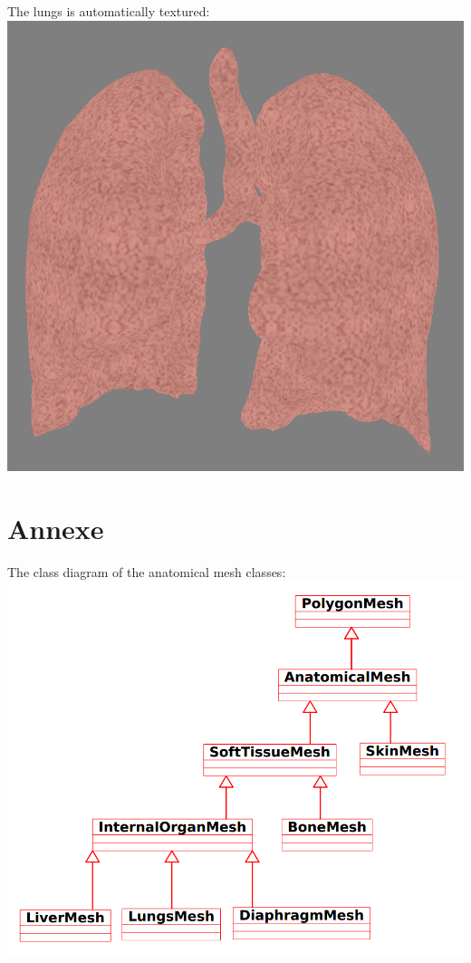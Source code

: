 \documentclass[12pt]{report}
\begin{document}
The lungs is automatically textured:\\

\includegraphics[scale = 0.5]{img/textured_lungs.png}

\chapter{Annexe}

The class diagram of the anatomical mesh classes:\\

\includegraphics[scale = 0.5]{img/UML.png}
\end{document}
